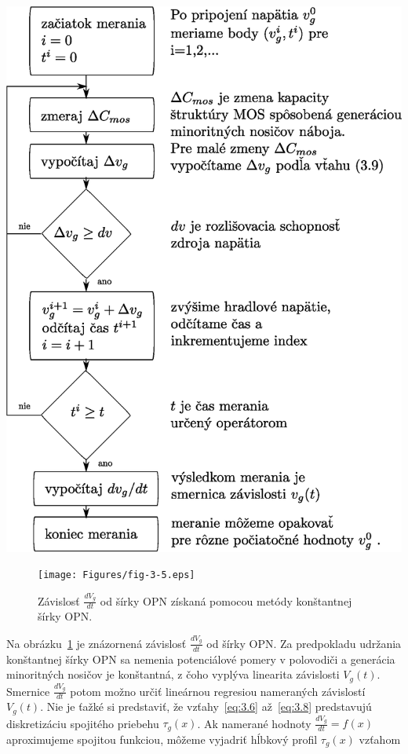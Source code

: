 \begin{diagram}
  \includegraphics[scale=0.55,keepaspectratio]{Figures/diagram-2.EPS}\label{diagram:2}
\end{diagram}

\begin{figure}[h!]\centering
  \texttt{[image: Figures/fig-3-5.eps]}
  \caption[Závislosť $\frac{dV_g}{dt}$ od šírky OPN získaná pomocou
    metódy konštantnej šírky OPN]{Závislosť $\frac{dV_g}{dt}$ od šírky
    OPN získaná pomocou metódy konštantnej šírky OPN.}\label{fig:3.5}
\end{figure}

Na obrázku~\ref{fig:3.5} je znázornená závislosť $\frac{dV_g}{dt}$ od
šírky OPN\@. Za predpokladu udržania konštantnej šírky OPN sa nemenia
potenciálové pomery v polovodiči a generácia minoritných nosičov je
konštantná, z čoho vyplýva linearita závislosti $V_g(t)$.  Smernice
$\frac{dV_g}{dt}$ potom možno určiť lineárnou regresiou nameraných
závislostí $V_g(t)$. Nie je ťažké si predstaviť, že
vzťahy~\ref{eq:3.6} až~\ref{eq:3.8} predstavujú diskretizáciu
spojitého priebehu $\tau_g(x)$. Ak namerané hodnoty
$\frac{dV_g}{dt}=f(x)$ aproximujeme spojitou funkciou, môžeme vyjadriť
hĺbkový profil $\tau_g(x)$ vzťahom

